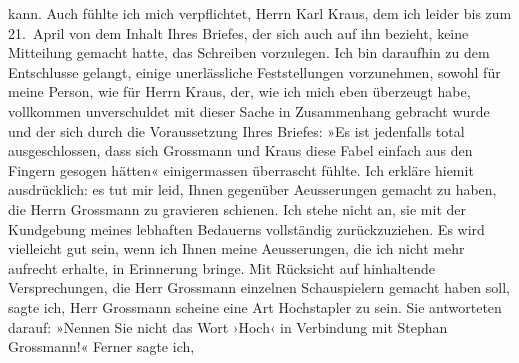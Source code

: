 \begin{ledgroupsized}[t]{13cm}
                    kann. Auch fühlte ich mich verpflichtet, Herrn Karl Kraus, dem ich leider bis zum 21. April von dem
                    Inhalt Ihres Briefes, der sich auch auf ihn bezieht, keine Mitteilung gemacht
                    hatte, das Schreiben vorzulegen. Ich bin daraufhin zu dem Entschlusse gelangt,
                    einige unerlässliche Feststellungen vorzunehmen, sowohl für meine Person, wie
                    für Herrn Kraus, der, wie ich mich eben
                    überzeugt habe, vollkommen unverschuldet mit dieser Sache in Zusammenhang
                    gebracht wurde und der sich durch die Voraussetzung Ihres Briefes: »Es ist
                    jedenfalls total ausgeschlossen, dass sich Grossmann und Kraus diese Fabel
                    einfach aus den Fingern gesogen hätten« einigermassen überrascht fühlte.\pend
           \pstart
           Ich erkläre hiemit ausdrücklich: es tut mir leid, Ihnen gegenüber Aeusserungen
                    gemacht zu haben, die Herrn Grossmann zu
                    gravieren schienen. Ich stehe nicht an, sie mit der Kundgebung meines lebhaften
                    Bedauerns vollständig zurückzuziehen. Es wird vielleicht gut sein, wenn ich
                    Ihnen meine Aeusserungen, die ich nicht mehr aufrecht erhalte, in Erinnerung
                    bringe. Mit Rücksicht auf hinhaltende Versprechungen, die Herr Grossmann einzelnen {\pb}Schauspielern gemacht haben soll, sagte ich, Herr Grossmann scheine eine Art Hochstapler zu sein. Sie
                    antworteten darauf: »Nennen Sie nicht das Wort ›Hoch‹ in Verbindung mit Stephan Grossmann!« Ferner sagte ich,

\end{ledgroupsized}
